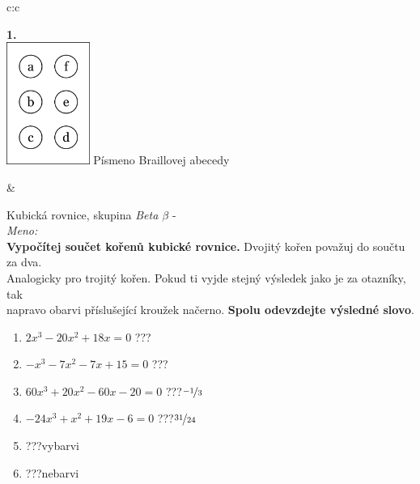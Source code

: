 \documentclass[10pt]{report}
\begin{document}
\begin{tabular}{c:c}
\begin{minipage}[c][99mm][t]{0.49\linewidth}
\begin{center}
\begin{minipage}{0.20\linewidth}
\begin{center}
{\Huge\bfseries 1.} \\[2mm]
\includegraphics[height=40mm]{../images/braille.png}
{\small Písmeno Braillovej abecedy}
\end{center}
\end{minipage}
\end{center}
\end{minipage}
&
\begin{minipage}[c][99mm][t]{0.49\linewidth}
\begin{center}
\vspace{7mm}
{\huge Kubická rovnice, skupina \textit{Beta $\beta$} -}\\[4.5mm]
\textit{Meno:}\phantom{xxxxxxxxxxxxxxxxxxxxxxxxxxxxxxxxxxxxxxxxxxxxxxxxxxxxxxxxxxxxxxxxx}\\[3.5mm]
\textbf{Vypočítej součet kořenů kubické rovnice.} Dvojitý kořen považuj do součtu za dva.\\Analogicky pro trojitý kořen. Pokud ti vyjde stejný výsledek jako je za otazníky, tak\\napravo obarvi příslušející kroužek načerno. \textbf{Spolu odevzdejte výsledné slovo}.\\[3mm]
\begin{minipage}{0.77\linewidth}
\begin{center}
\begin{varwidth}{\textwidth}
\begin{enumerate}
\large
\item $2x^3-20x^2+18x=0$\quad \dotfill\; ???\;\dotfill {}
\item $-x^3-7x^2-7x+15=0$\quad \dotfill\; ???\;\dotfill {}
\item $60x^3+20x^2-60x-20=0$\quad \dotfill\; ???\;\dotfill \quad $\nicefrac{-1}{3}$
\item $-24x^3+x^2+19x-6=0$\quad \dotfill\; ???\;\dotfill \quad $\nicefrac{31}{24}$
\item \quad \dotfill\; ???\;\dotfill \quad vybarvi
\item \quad \dotfill\; ???\;\dotfill \quad nebarvi
\end{enumerate}
\end{varwidth}

\end{center}
\end{minipage}
\end{center}
\end{minipage}
\end{tabular}
\end{document}
